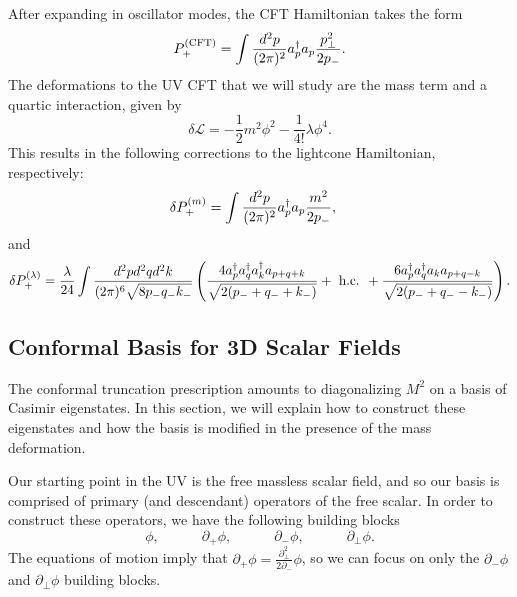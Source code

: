 After expanding in oscillator modes, the CFT Hamiltonian takes the form 
\begin{equation}
    \begin{aligned}
        P_+^{(\textrm{CFT})} = \int \frac{d^2 p}{(2\pi)^2} a^\dagger_p a_p \frac{p_\bot^2}{2p_-}.
    \end{aligned}
\end{equation}
The deformations to the UV CFT that we will study are the mass term and a 
quartic interaction, given by 
\begin{equation}
    \delta \mathcal{L} = - \frac{1}{2}m^2 \phi^2 - \frac{1}{4!} \lambda \phi^4.
\end{equation} 
This results in the following corrections to the lightcone Hamiltonian, 
respectively: 
\begin{equation}
    \begin{aligned}
        \delta P_+^{(m)} &= \int \frac{d^2 p}{(2\pi)^2} a^\dagger_p a_p \frac{m^2}{2p_-}, \label{massdeformation}
    \end{aligned}
\end{equation} 
and 
\begin{equation}
    \begin{aligned}
        \delta P_+^{(\lambda)} = \frac{\lambda}{24} \int \frac{d^2p d^2 q d^2 k}{(2\pi)^6 \sqrt{8 p_- q_- k_-}} \left( \frac{4 a^\dagger_p a^\dagger_q a^\dagger_k a_{p+q+k}}{\sqrt{2(p_- + q_- + k_-)}} + \textrm{ h.c. } + \frac{6 a^\dagger_p a^\dagger_q a_k a_{p+q-k}}{\sqrt{2(p_- + q_- - k_-)}} \right).
    \end{aligned}
\end{equation}



\subsection{Conformal Basis for 3D Scalar Fields}

The conformal truncation prescription amounts to diagonalizing $M^2$ on a basis 
of Casimir eigenstates. In this section, we will explain how to construct these 
eigenstates and how the basis is modified in the presence of the mass 
deformation.

Our starting point in the UV is the free massless scalar field, and so our basis 
is comprised of primary (and descendant) operators of the free scalar. In order 
to construct these operators, we have the following building blocks 
\begin{equation}
    \phi, \quad\quad\quad \partial_+ \phi, \quad\quad\quad \partial_-\phi, \quad\quad\quad \partial_\bot\phi. \label{basisbuildingblocks}
\end{equation} 
The equations of motion imply that
$\partial_+ \phi = \frac{\partial_\bot^2}{2 \partial_-} \phi$, so we can focus 
on only the $\partial_- \phi$ and $\partial_\bot \phi$ building blocks.

